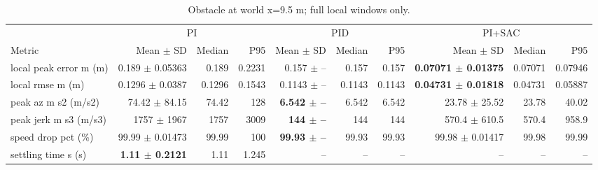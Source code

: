 \begin{table}[t]
\centering
\scriptsize
\caption{Obstacle at world x=9.5 m; full local windows only.}
\label{tab:obstacle-14}
\begin{tabular}{p{}*{9}{r}}
\toprule
 & \multicolumn{3}{c}{PI} & \multicolumn{3}{c}{PID} & \multicolumn{3}{c}{PI+SAC} \\
\cmidrule(lr){2-4}\cmidrule(lr){5-7}\cmidrule(lr){8-10}
Metric & Mean $\pm$ SD & Median & P95 & Mean $\pm$ SD & Median & P95 & Mean $\pm$ SD & Median & P95 \\
\midrule
local peak error m (m) & 0.189 $\pm$ 0.05363 & 0.189 & 0.2231 & 0.157 $\pm$ -- & 0.157 & 0.157 & \textbf{0.07071 $\pm$ 0.01375} & 0.07071 & 0.07946 \\
local rmse m (m) & 0.1296 $\pm$ 0.0387 & 0.1296 & 0.1543 & 0.1143 $\pm$ -- & 0.1143 & 0.1143 & \textbf{0.04731 $\pm$ 0.01818} & 0.04731 & 0.05887 \\
peak az m s2 (m/s2) & 74.42 $\pm$ 84.15 & 74.42 & 128 & \textbf{6.542 $\pm$ --} & 6.542 & 6.542 & 23.78 $\pm$ 25.52 & 23.78 & 40.02 \\
peak jerk m s3 (m/s3) & 1757 $\pm$ 1967 & 1757 & 3009 & \textbf{144 $\pm$ --} & 144 & 144 & 570.4 $\pm$ 610.5 & 570.4 & 958.9 \\
speed drop pct (\%) & 99.99 $\pm$ 0.01473 & 99.99 & 100 & \textbf{99.93 $\pm$ --} & 99.93 & 99.93 & 99.98 $\pm$ 0.01417 & 99.98 & 99.99 \\
settling time s (s) & \textbf{1.11 $\pm$ 0.2121} & 1.11 & 1.245 & -- & -- & -- & -- & -- & -- \\
\bottomrule
\end{tabular}
\end{table}
